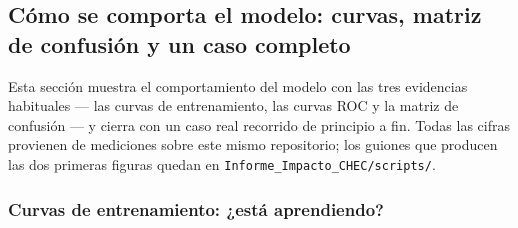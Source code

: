 \documentclass[11pt,a4paper]{article}
\begin{document}
\subsection{Cómo se comporta el modelo: curvas, matriz de confusión y un caso completo}
\label{sec:comportamiento}

\begin{bloquenuevo}
Esta sección muestra el comportamiento del modelo con las tres evidencias habituales
--- las curvas de entrenamiento, las curvas ROC y la matriz de confusión --- y cierra con un
caso real recorrido de principio a fin. Todas las cifras provienen de mediciones sobre este
mismo repositorio; los guiones que producen las dos primeras figuras quedan en
\texttt{Informe\_Impacto\_CHEC/scripts/}.
\end{bloquenuevo}

\subsubsection{Curvas de entrenamiento: ¿está aprendiendo?}
\end{document}
